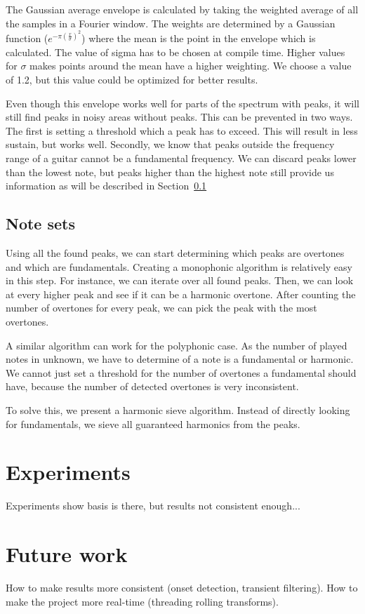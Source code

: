 \documentclass[10pt,twocolumn]{article}
\begin{document}
The Gaussian average envelope is calculated by taking the weighted average of all the samples in a Fourier window. The weights are determined by a Gaussian function ($e^{-\pi(\frac{x}{\sigma})^2}$) where the mean is the point in the envelope which is calculated. The value of sigma has to be chosen at compile time. Higher values for $\sigma$ makes points around the mean have a higher weighting. We choose a value of 1.2, but this value could be optimized for better results.

Even though this envelope works well for parts of the spectrum with peaks, it will still find peaks in noisy areas without peaks. This can be prevented in two ways. The first is setting a threshold which a peak has to exceed. This will result in less sustain, but works well. Secondly, we know that peaks outside the frequency range of a guitar cannot be a fundamental frequency. We can discard peaks lower than the lowest note, but peaks higher than the highest note still provide us information as will be described in Section~\ref{sub:impnoteset}

\subsection{Note sets}  \label{sub:impnoteset}
Using all the found peaks, we can start determining which peaks are overtones and which are fundamentals. Creating a monophonic algorithm is relatively easy in this step. For instance, we can iterate over all found peaks. Then, we can look at every higher peak and see if it can be a harmonic overtone. After counting the number of overtones for every peak, we can pick the peak with the most overtones.

A similar algorithm can work for the polyphonic case. As the number of played notes in unknown, we have to determine of a note is a fundamental or harmonic. We cannot just set a threshold for the number of overtones a fundamental should have, because the number of detected overtones is very inconsistent.

To solve this, we present a harmonic sieve algorithm. Instead of directly looking for fundamentals, we sieve all guaranteed harmonics from the peaks.


\section{Experiments}  \label{sec:exp}
Experiments show basis is there, but results not consistent enough...


\section{Future work}  \label{sec:future}
How to make results more consistent (onset detection, transient filtering). How to make the project more real-time (threading rolling transforms).






\end{document}
